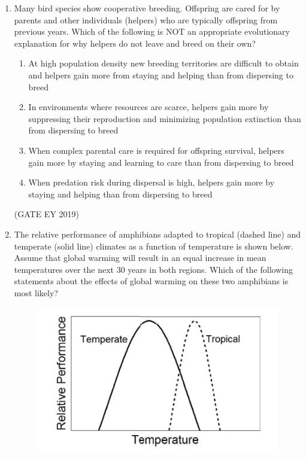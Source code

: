 \documentclass[journal,12pt,onecolumn]{IEEEtran}
\theoremstyle{remark}
\begin{document}
\begin{enumerate}
\begin{multicols}{2}
\begin{enumerate}
\item Evolution of resistance is neutral
\item Snakes in Area 2 are more adapted than the others
\item Snakes in Area 3 are less adapted than the others
\item The resistance mechanism is costly
\end{enumerate}
\end{multicols}
\hfill{(GATE EY 2019)}
\item Many bird species show cooperative breeding. Offspring are cared for by parents and other individuals (helpers) who are typically offspring from previous years. Which of the following is NOT an appropriate evolutionary explanation for why helpers do not leave and breed on their own?

\begin{enumerate}
\item At high population density new breeding territories are difficult to obtain and helpers gain more from staying and helping than from dispersing to breed
\item In environments where resources are scarce, helpers gain more by suppressing their reproduction and minimizing population extinction than from dispersing to breed
\item When complex parental care is required for offspring survival, helpers gain more by staying and learning to care than from dispersing to breed
\item When predation risk during dispersal is high, helpers gain more by staying and helping than from dispersing to breed
\end{enumerate}


\hfill{(GATE EY 2019)}


\item The relative performance of amphibians adapted to tropical (dashed line) and temperate (solid line) climates as a function of temperature is shown below. Assume that global warming will result in an equal increase in mean temperatures over the next 30 years in both regions. Which of the following statements about the effects of global warming on these two amphibians is most likely?
\begin{figure}[H]
    \centering
    \includegraphics[]{figs/37.png}
    \caption{}
    \label{fig:9}
\end{figure}


\end{enumerate}
\end{document}
